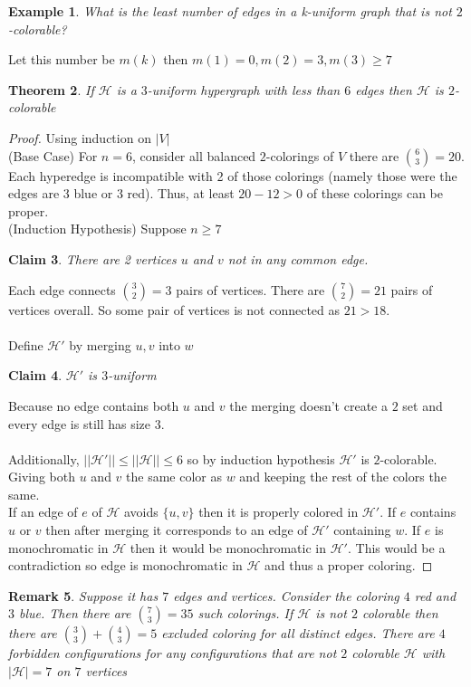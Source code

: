 \documentclass[a4paper]{article}
\newtheorem{thm}{Theorem}[section]
\newtheorem{eg}[thm]{Example}
\newtheorem{claim}[thm]{Claim}
\newtheorem{rmk}[thm]{Remark}
\begin{document}
\begin{eg}
    What is the least number of edges in a k-uniform graph that is not $2$-colorable?
\end{eg}
Let this number be $m(k)$ then $m(1)=0, m(2)=3,m(3)\geq 7$
\begin{thm}
    If $\mathcal{H}$ is a $3$-uniform hypergraph with less than $6$ edges then $\mathcal{H}$ is $2$-colorable
\end{thm}
\begin{proof}
    Using induction on $|V|$\\
    (Base Case) For $n=6$, consider all balanced $2$-colorings of $V$ there are ${6 \choose 3}=20.$ Each hyperedge is incompatible with 2 of those colorings (namely those were the edges are 3 blue or 3 red). Thus, at least $20-12>0$ of these colorings can be proper.\\
    (Induction Hypothesis) Suppose $n\geq 7$
    \begin{claim}
        There are 2 vertices $u$ and $v$ not in any common edge.
    \end{claim}
    \noindent Each edge connects ${3 \choose 2}=3$ pairs of vertices. There are ${7 \choose 2}=21$ pairs of vertices overall. So some pair of vertices is not connected as $21>18.$\\\\
    Define $\mathcal{H}'$ by merging $u,v$ into $w$
    \begin{claim}
        $\mathcal{H}'$ is $3$-uniform 
    \end{claim}
    \noindent Because no edge contains both $u$ and $v$ the merging doesn't create a $2$ set and every edge is still has size $3.$\\\\
    Additionally, $||\mathcal{H}'||\leq ||\mathcal{H}||\leq 6$ so by induction hypothesis $\mathcal{H}'$ is $2$-colorable. Giving both $u$ and $v$ the same color as $w$ and keeping the rest of the colors the same. \\

    \noindent If an edge of $e$ of $\mathcal{H}$ avoids $\{u,v\}$ then it is properly colored in $\mathcal{H}'.$ If $e$ contains $u$ or $v$ then after merging it corresponds to an edge of $\mathcal{H}'$ containing $w.$ If $e$ is monochromatic in $\mathcal{H}$ then it would be monochromatic in $\mathcal{H}'.$ This would be a contradiction so edge is monochromatic in $\mathcal{H}$ and thus a proper coloring. 
\end{proof}
\begin{rmk}
        Suppose it has $7$ edges and vertices. Consider the coloring $4$ red and $3$ blue. Then there are ${7 \choose 3}=35$ such colorings. If $\mathcal{H}$ is not $2$ colorable then there are ${3 \choose 3}+{4 \choose 3}=5$ excluded coloring for all distinct edges. There are $4$ forbidden configurations for any configurations that are not $2$ colorable $\mathcal{H}$ with $|\mathcal{H}|=7$ on $7$ vertices
\end{rmk}
\end{document}
